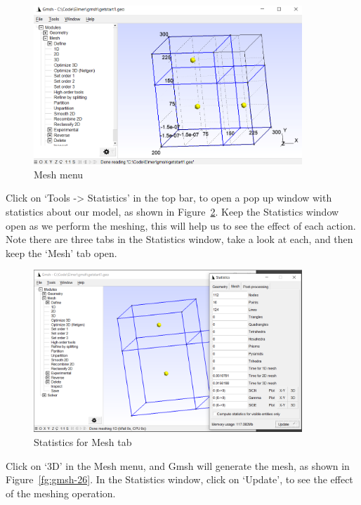 \begin{figure}[H]
\centering
\includegraphics[width=0.9\textwidth]{gmsh-24}
\caption{Mesh menu}\label{fg:gmsh-24}
\end{figure}

\newpage

Click on `Tools -> Statistics' in the top bar, to open a pop up window with statistics about our model, as shown in Figure~\ref{fg:gmsh-25}.  Keep the Statistics window open as we perform the meshing, this will help us to see the effect of each action.  Note there are three tabs in the Statistics window, take a look at each, and then keep the `Mesh' tab open.

\begin{figure}[H]
\centering
\includegraphics[width=0.9\textwidth]{gmsh-25}
\caption{Statistics for Mesh tab}\label{fg:gmsh-25}
\end{figure}

Click on `3D' in the Mesh menu, and Gmsh will generate the mesh, as shown in Figure~\ref{fg:gmsh-26}.  In the Statistics window, click on `Update', to see the effect of the meshing operation.

